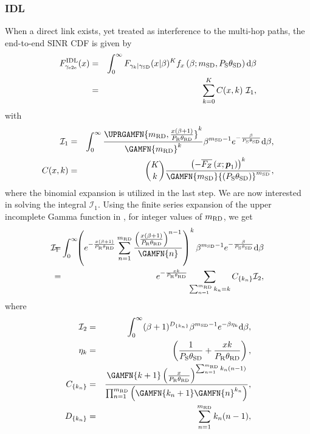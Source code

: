 \documentclass[10pt,journal]{IEEEtran}
\begin{document}
\subsubsection{\ac{IDL}}
When a direct link exists, yet treated as interference to the multi-hop paths, the end-to-end \ac{SINR} \ac{CDF} is given by
\begin{eqnarray}
F_{\gamma_{\rm e2e}}^{\text{IDL}}(x)
&=&\int_0^\infty F_{\gamma_{k} \vert \gamma_{{\rm S} {\rm D}}}(x \vert \beta)^K f_x\left(\beta;{m_{{\rm S} {\rm D}}},P_{{\rm S}}{\theta_{{\rm S} {\rm D}}}\right) \mathrm{d}\beta\nonumber\\
&=&\sum_{k=0}^K C(x,k)~~\mathcal{I}_1,
\end{eqnarray}
with \vspace{-4mm}
\begin{eqnarray}
\mathcal{I}_1
&=&
\int_0^\infty \frac{\UPRGAMFN{\mrd,\frac{\RVval(\beta+1)}{\PR\thetard}}^k}{\GAMFN{\mrd}^k} \beta^{\msd-1}e^{-\frac{\beta}{\PS\thetasd}} \mathrm{d}\beta,\nonumber\\
C(\RVval,k)
&=&
{K \choose k} \frac{\left(-\overline{F_{Z}}\left(\RVval;\pv_1\right) \right)^k}{\GAMFN{\msd}{\left(\PS\thetasd\right)}^{\msd}}\nonumber,
\end{eqnarray}
where the binomial expansion is utilized in the last step. We are now interested in solving the integral $\mathcal{I}_1$. Using the finite series expansion of the upper incomplete Gamma function in \cite[Eq. 8.352-2]{gradshteyn_ryzhik}, for integer values of ${m_{{\rm R} {\rm D}}}$, we get
\begin{eqnarray}
\!\mathcal{I}_1
\!\!\!\!\!&=&\!\!\!\!\! \int_0^\infty \!\! \left(e^{-\frac{\RVval(\beta+1)}{\PR\thetard}}\sum_{n=1}^{\mrd}  \frac{\left(\frac{\RVval(\beta+1)}{\PR\thetard}\right)^{n-1}}{\GAMFN{n}}  \right)^k    \beta^{\msd-1}e^{-\frac{\beta}{\PS\thetasd}} \mathrm{d}\beta\nonumber\\
\!\!\!\!&=&\!\!\!\! e^{-\frac{\RVval k}{\PR\thetard}} \sum_{\sum_{n=1}^{\mrd} k_{n} = k} C_{\{k_n\}} \mathcal{I}_2,
\label{multinomial_theorem_applied_1}
\end{eqnarray}
where \vspace{-4mm}
\begin{eqnarray}
\mathcal{I}_2&=&\int_0^\infty (\beta+1)^{D_{\{k_n\}}}\beta^{\msd-1}e^{-\beta\eta_k} \mathrm{d}\beta,\label{I_2}\\
\eta_k&=&\left(\frac{1}{\PS\thetasd}+\frac{\RVval k}{\PR\thetard}\right),\\
C_{\{k_n\}}&=&\frac{\GAMFN{k+1}\left(\frac{\RVval}{\PR\thetard}\right)^{\sum_{n=1}^{\mrd}k_n(n-1)}}{\prod_{n=1}^{\mrd}\left(\GAMFN{k_n+1}\GAMFN{n}^{k_n}\right)},\\
D_{\{k_n\}}&=&\sum_{n=1}^{\mrd}k_n(n-1),
\end{eqnarray}
\end{document}
